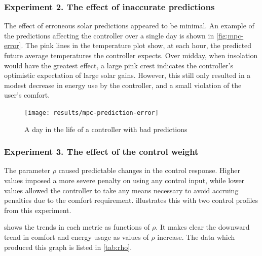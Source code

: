 \subsubsection{Experiment 2. The effect of inaccurate predictions}

The effect of erroneous solar predictions appeared to be minimal.
An example of the predictions affecting the controller over a single day is shown in \autoref{fig:mpc-error}.
The pink lines in the temperature plot show, at each hour, the predicted future average temperatures the controller expects.
Over midday, when insolation would have the greatest effect, a large pink crest indicates the controller's optimistic expectation of large solar gains.
However, this still only resulted in a modest decrease in energy use by the controller, and a small violation of the user's comfort.

\begin{figure}
   \centering
   \texttt{[image: results/mpc-prediction-error]}
   \caption{A day in the life of a controller with bad predictions}
   \label{fig:mpc-error}
\end{figure}

\subsubsection{Experiment 3. The effect of the control weight}

The parameter $\rho$ caused predictable changes in the control response.
Higher values imposed a more severe penalty on using any control input, while lower values allowed the controller to take any means necessary to avoid accruing penalties due to the comfort requirement.
 illustrates this with two control profiles from this experiment.

 shows the trends in each metric as functions of $\rho$.
It makes clear the downward trend in comfort and energy usage as values of $\rho$ increase.
The data which produced this graph is listed in \autoref{tab:rho}.

